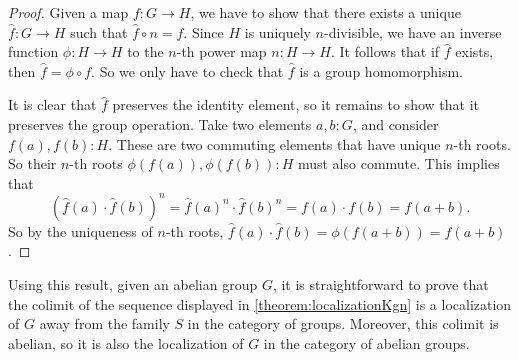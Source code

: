 \begin{proof}
    Given a map $f : G \to H$, we have to show that there exists a unique $\hat{f} : G \to H$ such that
    $\hat{f} \circ n = f$.
    Since $H$ is uniquely $n$-divisible, we have an inverse function $\phi : H \to H$ to the $n$-th power map $n : H \to H$.
    It follows that if $\hat{f}$ exists, then $\hat{f} = \phi \circ f$.
    So we only have to check that $\hat{f}$ is a group homomorphism.

    It is clear that $\hat{f}$ preserves the identity element, so it remains to show that it preserves
    the group operation. Take two elements $a,b : G$, and consider $f(a),f(b) : H$. These are two commuting
    elements that have unique $n$-th roots. So their $n$-th roots $\phi(f(a)), \phi(f(b)) : H$ must also
    commute. This implies that
    \[
        (\hat{f}(a) \cdot \hat{f}(b))^n = \hat{f}(a)^n \cdot \hat{f}(b)^n = f(a) \cdot f(b) = f(a + b) .
    \]
    So by the uniqueness of $n$-th roots, $\hat{f}(a) \cdot \hat{f}(b) = \phi(f(a + b)) = \hat{f}(a+b)$.
\end{proof}

Using this result, given an abelian group $G$,
it is straightforward to prove that the colimit of the sequence displayed in
\cref{theorem:localizationKgn} is a localization of $G$ away from the family $S$
in the category of groups.
Moreover, this colimit is abelian, so it is also the localization of $G$
in the category of abelian groups.
